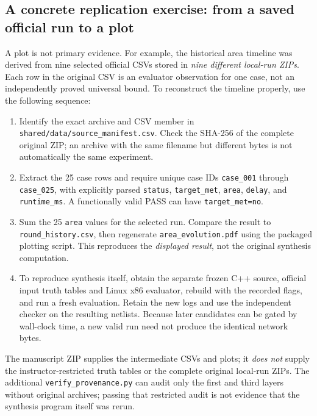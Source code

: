 \subsection{A concrete replication exercise: from a saved official run to a plot}
A plot is not primary evidence. For example, the historical area timeline was derived from nine selected official CSVs stored in \emph{nine different local-run ZIPs}. Each row in the original CSV is an evaluator observation for one case, not an independently proved universal bound. To reconstruct the timeline properly, use the following sequence:
\begin{enumerate}[leftmargin=2em]
\item Identify the exact archive and CSV member in \texttt{shared/data/source\_manifest.csv}. Check the SHA-256 of the complete original ZIP; an archive with the same filename but different bytes is not automatically the same experiment.
\item Extract the 25 case rows and require unique case IDs \texttt{case\_001} through \texttt{case\_025}, with explicitly parsed \texttt{status}, \texttt{target\_met}, \texttt{area}, \texttt{delay}, and \texttt{runtime\_ms}. A functionally valid PASS can have \texttt{target\_met=no}.
\item Sum the 25 \texttt{area} values for the selected run. Compare the result to \texttt{round\_history.csv}, then regenerate \texttt{area\_evolution.pdf} using the packaged plotting script. This reproduces the \emph{displayed result}, not the original synthesis computation.
\item To reproduce synthesis itself, obtain the separate frozen C++ source, official input truth tables and Linux x86 evaluator, rebuild with the recorded flags, and run a fresh evaluation. Retain the new logs and use the independent checker on the resulting netlists. Because later candidates can be gated by wall-clock time, a new valid run need not produce the identical network bytes.
\end{enumerate}
The manuscript ZIP supplies the intermediate CSVs and plots; it \emph{does not} supply the instructor-restricted truth tables or the complete original local-run ZIPs. The additional \texttt{verify\_provenance.py} can audit only the first and third layers without original archives; passing that restricted audit is not evidence that the synthesis program itself was rerun.

